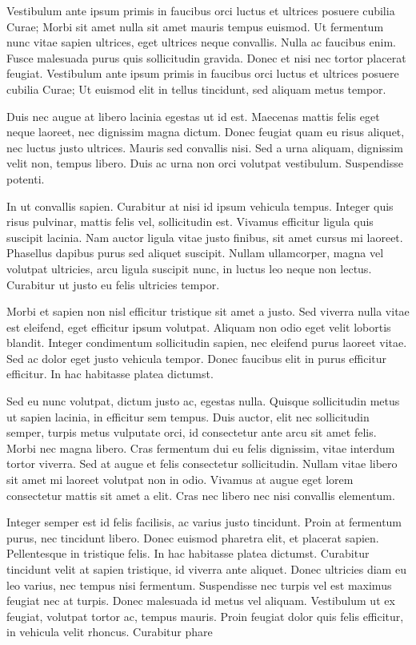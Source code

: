 Vestibulum ante ipsum primis in faucibus orci luctus et ultrices posuere cubilia Curae; Morbi sit amet nulla sit amet mauris tempus euismod. Ut fermentum nunc vitae sapien ultrices, eget ultrices neque convallis. Nulla ac faucibus enim. Fusce malesuada purus quis sollicitudin gravida. Donec et nisi nec tortor placerat feugiat. Vestibulum ante ipsum primis in faucibus orci luctus et ultrices posuere cubilia Curae; Ut euismod elit in tellus tincidunt, sed aliquam metus tempor.

Duis nec augue at libero lacinia egestas ut id est. Maecenas mattis felis eget neque laoreet, nec dignissim magna dictum. Donec feugiat quam eu risus aliquet, nec luctus justo ultrices. Mauris sed convallis nisi. Sed a urna aliquam, dignissim velit non, tempus libero. Duis ac urna non orci volutpat vestibulum. Suspendisse potenti.

In ut convallis sapien. Curabitur at nisi id ipsum vehicula tempus. Integer quis risus pulvinar, mattis felis vel, sollicitudin est. Vivamus efficitur ligula quis suscipit lacinia. Nam auctor ligula vitae justo finibus, sit amet cursus mi laoreet. Phasellus dapibus purus sed aliquet suscipit. Nullam ullamcorper, magna vel volutpat ultricies, arcu ligula suscipit nunc, in luctus leo neque non lectus. Curabitur ut justo eu felis ultricies tempor.

Morbi et sapien non nisl efficitur tristique sit amet a justo. Sed viverra nulla vitae est eleifend, eget efficitur ipsum volutpat. Aliquam non odio eget velit lobortis blandit. Integer condimentum sollicitudin sapien, nec eleifend purus laoreet vitae. Sed ac dolor eget justo vehicula tempor. Donec faucibus elit in purus efficitur efficitur. In hac habitasse platea dictumst.

Sed eu nunc volutpat, dictum justo ac, egestas nulla. Quisque sollicitudin metus ut sapien lacinia, in efficitur sem tempus. Duis auctor, elit nec sollicitudin semper, turpis metus vulputate orci, id consectetur ante arcu sit amet felis. Morbi nec magna libero. Cras fermentum dui eu felis dignissim, vitae interdum tortor viverra. Sed at augue et felis consectetur sollicitudin. Nullam vitae libero sit amet mi laoreet volutpat non in odio. Vivamus at augue eget lorem consectetur mattis sit amet a elit. Cras nec libero nec nisi convallis elementum.

Integer semper est id felis facilisis, ac varius justo tincidunt. Proin at fermentum purus, nec tincidunt libero. Donec euismod pharetra elit, et placerat sapien. Pellentesque in tristique felis. In hac habitasse platea dictumst. Curabitur tincidunt velit at sapien tristique, id viverra ante aliquet. Donec ultricies diam eu leo varius, nec tempus nisi fermentum. Suspendisse nec turpis vel est maximus feugiat nec at turpis. Donec malesuada id metus vel aliquam. Vestibulum ut ex feugiat, volutpat tortor ac, tempus mauris. Proin feugiat dolor quis felis efficitur, in vehicula velit rhoncus. Curabitur phare
